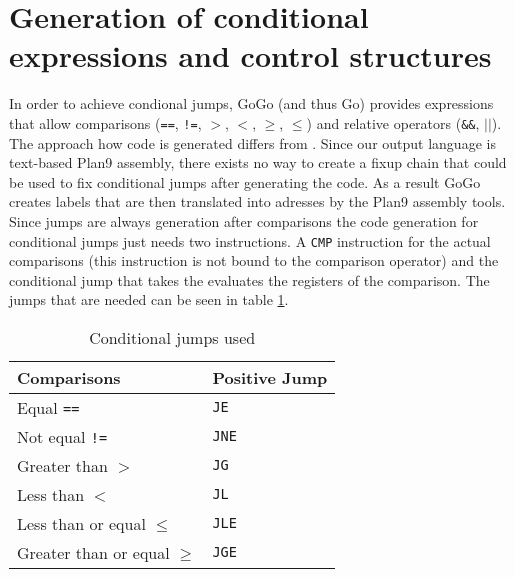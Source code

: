 \documentclass[a4paper]{scrreprt}
\begin{document}
    \section{Generation of conditional expressions and control structures}
      In order to achieve condional jumps, GoGo (and thus Go) provides expressions 
      that allow comparisons (\texttt{==}, \texttt{!=}, \texttt{$>$}, \texttt{$<$},
      \texttt{$\ge$}, \texttt{$\le$}) and relative operators (\texttt{\&\&},
      \texttt{$||$}). The approach how code is generated differs from \cite{wir96}.
      Since our output language is text-based Plan9 assembly, there exists no way
      to create a fixup chain that could be used to fix conditional jumps after
      generating the code. As a result GoGo creates labels that are then 
      translated into adresses by the Plan9 assembly tools. \\

      Since jumps are always generation after comparisons the code generation 
      for conditional jumps just needs two instructions. A \texttt{CMP} instruction
      for the actual comparisons (this instruction is not bound to the comparison
      operator) and the conditional jump that takes the evaluates the registers
      of the comparison. The jumps that are needed can be seen in table \ref{tbl:jumps}.

      \begin{table}[htb]
        \centering
        \begin{tabular}{ll}
        \toprule
        \textbf{Comparisons} & \textbf{Positive Jump} \\
        \midrule
        Equal \texttt{==} & \texttt{JE}\\
        Not equal \texttt{!=} & \texttt{JNE}\\
        Greater than \texttt{$>$} & \texttt{JG}\\
        Less than \texttt{$<$} & \texttt{JL}\\
        Less than or equal \texttt{$\le$} & \texttt{JLE}\\
        Greater than or equal \texttt{$\ge$} & \texttt{JGE}\\
        \bottomrule
        \end{tabular}
        \caption{Conditional jumps used}
        \label{tbl:jumps}
      \end{table}
\end{document}
